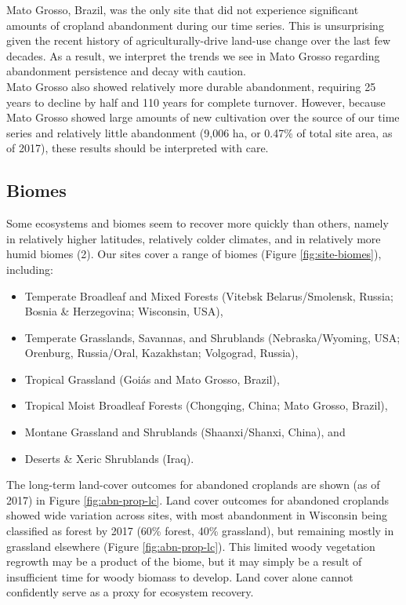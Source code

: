 \documentclass[9pt,twoside,lineno]{pnas-new}
\providecommand{\tightlist}{%
  \setlength{\itemsep}{0pt}\setlength{\parskip}{0pt}}
\begin{document}
Mato Grosso, Brazil, was the only site that did not experience significant amounts of cropland abandonment during our time series.
This is unsurprising given the recent history of agriculturally-drive land-use change over the last few decades.
As a result, we interpret the trends we see in Mato Grosso regarding abandonment persistence and decay with caution.\\
Mato Grosso also showed relatively more durable abandonment, requiring 25 years to decline by half and 110 years for complete turnover.
However, because Mato Grosso showed large amounts of new cultivation over the source of our time series and relatively little abandonment (9,006 ha, or 0.47\% of total site area, as of 2017), these results should be interpreted with care.

\hypertarget{biomes}{%
\subsection{Biomes}\label{biomes}}

Some ecosystems and biomes seem to recover more quickly than others, namely in relatively higher latitudes, relatively colder climates, and in relatively more humid biomes (2).
Our sites cover a range of biomes (Figure \ref{fig:site-biomes}), including:

\begin{itemize}
\tightlist
\item
  Temperate Broadleaf and Mixed Forests (Vitebsk Belarus/Smolensk, Russia; Bosnia \& Herzegovina; Wisconsin, USA),
\item
  Temperate Grasslands, Savannas, and Shrublands (Nebraska/Wyoming, USA; Orenburg, Russia/Oral, Kazakhstan; Volgograd, Russia),
\item
  Tropical Grassland (Goiás and Mato Grosso, Brazil),
\item
  Tropical Moist Broadleaf Forests (Chongqing, China; Mato Grosso, Brazil),
\item
  Montane Grassland and Shrublands (Shaanxi/Shanxi, China), and
\item
  Deserts \& Xeric Shrublands (Iraq).
\end{itemize}

The long-term land-cover outcomes for abandoned croplands are shown (as of 2017) in Figure \ref{fig:abn-prop-lc}.
Land cover outcomes for abandoned croplands showed wide variation across sites, with most abandonment in Wisconsin being classified as forest by 2017 (60\% forest, 40\% grassland), but remaining mostly in grassland elsewhere (Figure \ref{fig:abn-prop-lc}).
This limited woody vegetation regrowth may be a product of the biome, but it may simply be a result of insufficient time for woody biomass to develop.
Land cover alone cannot confidently serve as a proxy for ecosystem recovery.
\end{document}
